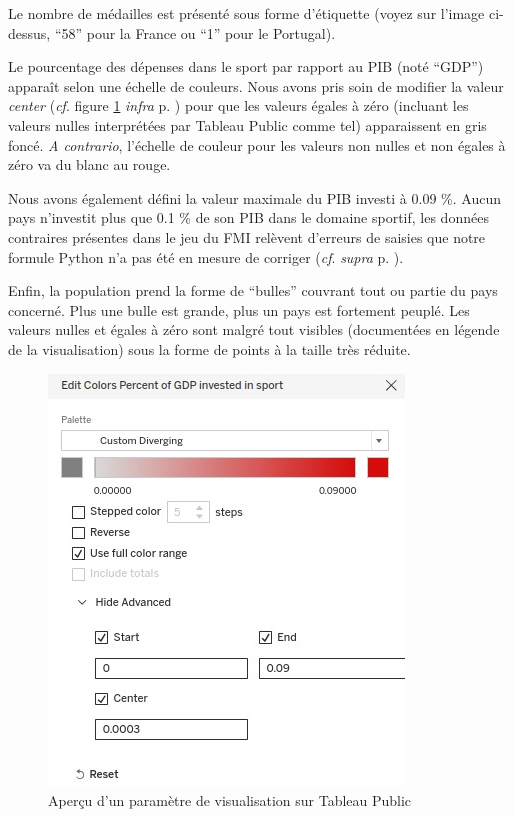\documentclass[hidelinks, 12pt]{report}
\begin{document}
Le nombre de médailles est présenté sous forme d'étiquette (voyez sur l'image ci-dessus, \enquote{58} pour la France ou \enquote{1} pour le Portugal).

\label{color}Le pourcentage des dépenses dans le sport par rapport au PIB (noté \enquote{GDP}) apparaît selon une échelle de couleurs. Nous avons pris soin de modifier la valeur \textit{center} (\textit{cf}. figure \ref{param} \textit{infra} p. \pageref{param}) pour que les valeurs égales à zéro (incluant les valeurs nulles interprétées par Tableau Public comme tel) apparaissent en gris foncé. \textit{A contrario}, l'échelle de couleur pour les valeurs non nulles et non égales à zéro va du blanc au rouge. 

Nous avons également défini la valeur maximale du PIB investi à 0.09 \%. Aucun pays n'investit plus que 0.1 \% de son PIB dans le domaine sportif, les données contraires présentes dans le jeu du FMI relèvent d'erreurs de saisies que notre formule Python n'a pas été en mesure de corriger (\textit{cf}. \textit{supra} p. \pageref{python}). 

Enfin, la population prend la forme de \enquote{bulles} couvrant tout ou partie du pays concerné. Plus une bulle est grande, plus un pays est fortement peuplé. Les valeurs nulles et égales à zéro sont malgré tout visibles (documentées en légende de la visualisation) sous la forme de points à la taille très réduite.

\begin{center}
	\begin{figure}[H]
		\centering
		\setlength{\belowcaptionskip}{-35pt}
		\includegraphics[scale=0.5]{images/datavis-medals-world-center.png}
		\caption{Aperçu d'un paramètre de visualisation sur Tableau Public}
		\label{param}
	\end{figure}
\end{center}
\end{document}
